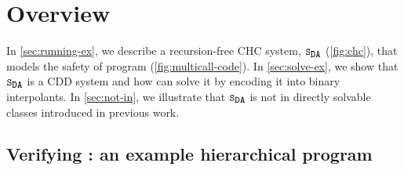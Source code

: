 \section{Overview}
\label{sec:overview}

In \autoref{sec:running-ex}, we describe a recursion-free CHC system,
$\mcchc$ (\autoref{fig:chc}), that models the safety of program  (\autoref{fig:multicall-code}).
%
In \autoref{sec:solve-ex}, we show that $\mcchc$ is a CDD system and
how \sys can solve it by encoding it into binary interpolants.
%
In \autoref{sec:not-in}, we illustrate that $\mcchc$ is not in
directly solvable classes introduced in previous work.
%

\subsection{Verifying : an example hierarchical program}
\label{sec:running-ex}

